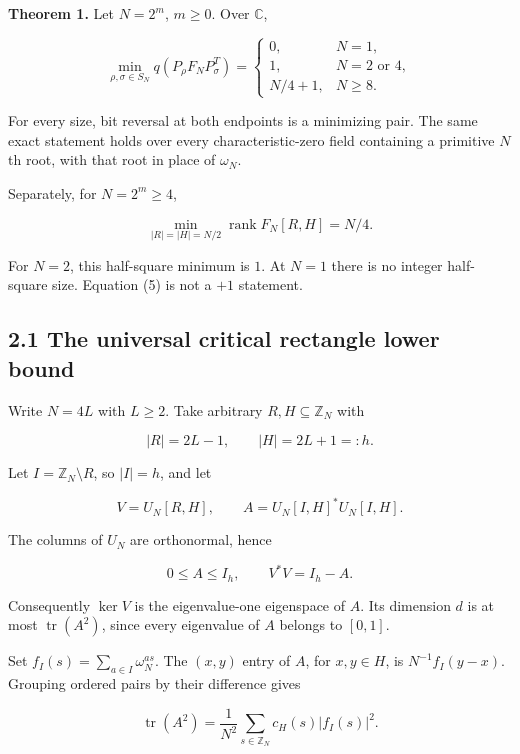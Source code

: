 \documentclass[
  11pt,
  letterpaper,
]{article}
\begin{document}
\textbf{Theorem 1.} Let \(N=2^m\), \(m\geq0\). Over \(\mathbb C\),

\[
\min_{\rho,\sigma\in S_N}q(P_\rho F_NP_\sigma^T)
=\begin{cases}
0,&N=1,\\
1,&N=2\text{ or }4,\\
N/4+1,&N\geq8.
\end{cases}                                                    \tag{4}
\]

For every size, bit reversal at both endpoints is a minimizing pair. The
same exact statement holds over every characteristic-zero field
containing a primitive \(N\)th root, with that root in place of
\(\omega_N\).

Separately, for \(N=2^m\geq4\),

\[
\min_{|R|=|H|=N/2}\operatorname{rank}F_N[R,H]=N/4.             \tag{5}
\]

For \(N=2\), this half-square minimum is \(1\). At \(N=1\) there is no
integer half-square size. Equation (5) is not a \(+1\) statement.

\subsection{2.1 The universal critical rectangle lower
bound}\label{the-universal-critical-rectangle-lower-bound}

Write \(N=4L\) with \(L\geq2\). Take arbitrary
\(R,H\subseteq\mathbb Z_N\) with

\[
|R|=2L-1,\qquad |H|=2L+1=:h.
\]

Let \(I=\mathbb Z_N\setminus R\), so \(|I|=h\), and let

\[
V=U_N[R,H],\qquad A=U_N[I,H]^*U_N[I,H].
\]

The columns of \(U_N\) are orthonormal, hence

\[
0\leq A\leq I_h,\qquad V^*V=I_h-A.                          \tag{6}
\]

Consequently \(\ker V\) is the eigenvalue-one eigenspace of \(A\). Its
dimension \(d\) is at most \(\operatorname{tr}(A^2)\), since every
eigenvalue of \(A\) belongs to \([0,1]\).

Set \(f_I(s)=\sum_{a\in I}\omega_N^{as}\). The \((x,y)\) entry of \(A\),
for \(x,y\in H\), is \(N^{-1}f_I(y-x)\). Grouping ordered pairs by their
difference gives

\[
\operatorname{tr}(A^2)=\frac1{N^2}\sum_{s\in\mathbb Z_N}
c_H(s)|f_I(s)|^2.                                             \tag{7}
\]
\end{document}
